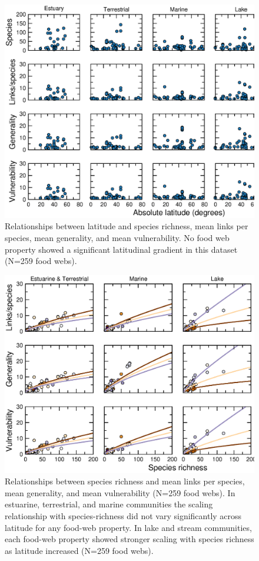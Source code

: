 \documentclass[12pt]{article}
\begin{document}
\begin{figure}[!h]
\label{Latfigs}
\includegraphics[width=.9\textwidth]{Figures/properties_vs_lat.eps}
\caption{Relationships between latitude and species richness, mean links per species, mean generality, and mean vulnerability. No food web property showed a significant latitudinal gradient in this dataset (N=259 food webs).}
\end{figure}


\begin{figure}[!h]
\label{scalingfig}
\includegraphics[width=.9\textwidth]{Figures/scaling_with_S_grey.eps}
\caption{Relationships between species richness and mean links per species, mean generality, and mean vulnerability (N=259 food webs). In estuarine, terrestrial, and marine communities the scaling relationship with species-richness did not vary significantly across latitude for any food-web property. In lake and stream communities, each food-web property showed stronger scaling with species richness as latitude increased (N=259 food webs). }
\end{figure}
\end{document}
